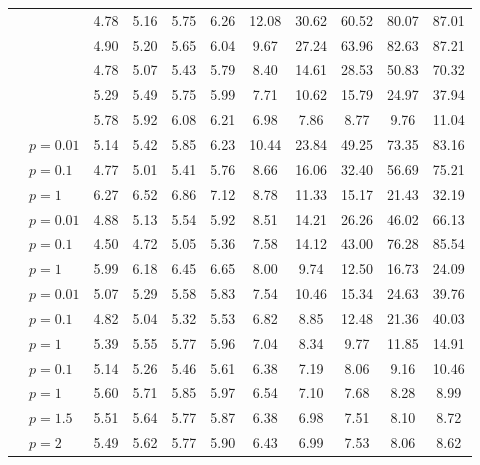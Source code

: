 \begin{table}
\begin{tabular}{| c | l | c | c | c | c | c | c | c | c | c |}
		& \Clipping[$0.25$] & 4.78 & 5.16 & 5.75 & 6.26 & 12.08 & 30.62 & 60.52 & 80.07 & 87.01\\
		& \Clipping[$0.2$] & 4.90 & 5.20 & 5.65 & 6.04 & 9.67 & 27.24 & 63.96 & 82.63 & 87.21\\
		& \Clipping[$0.15$] & 4.78 & 5.07 & 5.43 & 5.79 & 8.40 & 14.61 & 28.53 & 50.83 & 70.32\\
		& \Clipping[$0.1$] & 5.29 & 5.49 & 5.75 & 5.99 & 7.71 & 10.62 & 15.79 & 24.97 & 37.94\\
		& \Clipping[$0.05$] & 5.78 & 5.92 & 6.08 & 6.21 & 6.98 & 7.86 & 8.77 & 9.76 & 11.04\\
		\cline{2-11}
		& \Random[$0.2$] $p{=}0.01$ & 5.14 & 5.42 & 5.85 & 6.23 & 10.44 & 23.84 & 49.25 & 73.35 & 83.16\\
		& \Random[$0.2$] $p{=}0.1$ & 4.77 & 5.01 & 5.41 & 5.76 & 8.66 & 16.06 & 32.40 & 56.69 & 75.21\\
		& \Random[$0.2$] $p{=}1$ & 6.27 & 6.52 & 6.86 & 7.12 & 8.78 & 11.33 & 15.17 & 21.43 & 32.19\\
		& \Random[$0.15$] $p{=}0.01$ & 4.88 & 5.13 & 5.54 & 5.92 & 8.51 & 14.21 & 26.26 & 46.02 & 66.13\\
		& \Random[$0.15$] $p{=}0.1$ & 4.50 & 4.72 & 5.05 & 5.36 & 7.58 & 14.12 & 43.00 & 76.28 & 85.54\\
		& \Random[$0.15$] $p{=}1$ & 5.99 & 6.18 & 6.45 & 6.65 & 8.00 & 9.74 & 12.50 & 16.73 & 24.09\\
		& \Random[$0.1$] $p{=}0.01$ & 5.07 & 5.29 & 5.58 & 5.83 & 7.54 & 10.46 & 15.34 & 24.63 & 39.76\\
		& \Random[$0.1$] $p{=}0.1$ & 4.82 & 5.04 & 5.32 & 5.53 & 6.82 & 8.85 & 12.48 & 21.36 & 40.03\\
		& \Random[$0.1$] $p{=}1$ & 5.39 & 5.55 & 5.77 & 5.96 & 7.04 & 8.34 & 9.77 & 11.85 & 14.91\\
		& \Random[$0.05$] $p{=}0.1$ & 5.14 & 5.26 & 5.46 & 5.61 & 6.38 & 7.19 & 8.06 & 9.16 & 10.46\\
		& \Random[$0.05$] $p{=}1$ & 5.60 & 5.71 & 5.85 & 5.97 & 6.54 & 7.10 & 7.68 & 8.28 & 8.99\\
		& \Random[$0.05$] $p{=}1.5$ & 5.51 & 5.64 & 5.77 & 5.87 & 6.38 & 6.98 & 7.51 & 8.10 & 8.72\\
		& \Random[$0.05$] $p{=}2$ & 5.49 & 5.62 & 5.77 & 5.90 & 6.43 & 6.99 & 7.53 & 8.06 & 8.62\\
		\hline
	\end{tabular}
	\vspace*{-0.2cm}
\end{table}
